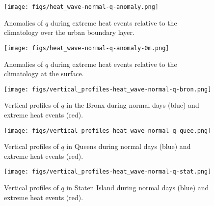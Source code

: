 \documentclass[11pt,a4paper]{article}
\begin{document}
\begin{figure}[ht]
	\centering
	\texttt{[image: figs/heat\_wave-normal-q-anomaly.png]}
	\caption{Anomalies of $q$ during extreme heat events relative to the climatology over the urban boundary layer.}
	\label{fig:extreme-heat-normal-comparison-contours-q}
\end{figure}
\begin{figure}[ht]
	\centering
	\texttt{[image: figs/heat\_wave-normal-q-anomaly-0m.png]}
	\caption{Anomalies of $q$ during extreme heat events relative to the climatology at the surface.}
	\label{fig:extreme-heat-normal-0m-comparison-q}
\end{figure}
\begin{figure}[ht]
	\centering
	\texttt{[image: figs/vertical\_profiles-heat\_wave-normal-q-bron.png]}
	\caption{Vertical profiles of $q$ in the Bronx during normal days (blue) and extreme heat events (red).}
	\label{fig:vertical_profiles-heat_wave-normal-q-bron}
\end{figure}
\begin{figure}[ht]
	\centering
	\texttt{[image: figs/vertical\_profiles-heat\_wave-normal-q-quee.png]}
	\caption{Vertical profiles of $q$ in Queens during normal days (blue) and extreme heat events (red).}
	\label{fig:vertical_profiles-heat_wave-normal-q-quee}
\end{figure}
\begin{figure}[ht]
	\centering
	\texttt{[image: figs/vertical\_profiles-heat\_wave-normal-q-stat.png]}
	\caption{Vertical profiles of $q$ in Staten Island during normal days (blue) and extreme heat events (red).}
	\label{fig:vertical_profiles-heat_wave-normal-q-stat}
\end{figure}
\end{document}
